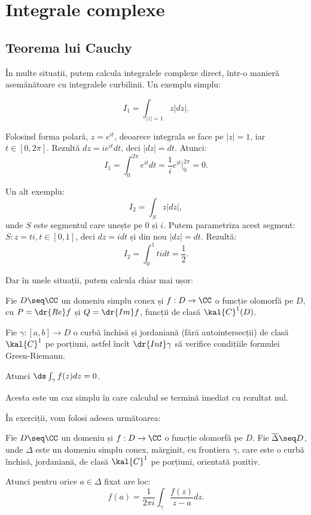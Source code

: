 
\chapter{Integrale complexe}

\section{Teorema lui Cauchy}
\indent\indent În multe situații, putem calcula integralele complexe direct,
într-o manieră asemănătoare cu integralele curbilinii. Un exemplu simplu:

\[
  I_1 = \int_{|z| = 1} z |dz|.
\]

Folosind forma polară, $ z = e^{it} $, deoarece integrala se face pe
$ |z| = 1 $, iar $ t \in [0, 2\pi] $. Rezultă $ dz = ie^{it} dt $,
deci $ |dz| = dt $. Atunci:
\[
  I_1 = \int_0^{2\pi} e^{it} dt = \dfrac{1}{i} e^{it} \Big|_0^{2\pi} = 0.
\]

Un alt exemplu:
\[
  I_2 = \int_S z |dz|,
\]
unde $ S $ este segmentul care unește pe $ 0 $ și $ i $. Putem parametriza
acest segment: $S : z = ti, t \in [0,1] $, deci $ dz = idt $ și din nou
$ |dz| = dt $. Rezultă:
\[
  I_2 = \int_0^1 tidt = \dfrac{1}{2}.
\]

Dar în unele situații, putem calcula chiar mai ușor:
\begin{theorem}[Cauchy]\label{thm:tcauchy} 
  Fie $ D \seq \CC $ un domeniu simplu conex și $ f : D \to \CC $ o funcție
  olomorfă pe $ D $, cu $ P = \dr{Re}f $ și $ Q = \dr{Im} f $, funcții de clasă
  $ \kal{C}^1(D) $.

  Fie $ \gamma : [a, b] \to D $ o curbă închisă și jordaniană (fără autointersecții)
  de clasă $ \kal{C}^1 $ pe porțiuni, astfel încît $ \dr{Int}\gamma $ să verifice
  condițiile formulei Green-Riemann.

  Atunci $ \ds\int_\gamma f(z) dz = 0 $.
\end{theorem}

Acesta este un caz simplu în care calculul se termină imediat cu rezultat nul.

În exerciții, vom folosi adesea următoarea:
\begin{theorem}\label{thm:fintcauchy}
  Fie $ D \seq \CC $ un domeniu și $ f : D \to \CC $ o funcție olomorfă pe $ D $.
  Fie $ \overline{\Delta} \seq D $, unde $ \Delta $ este un domeniu simplu conex,
  mărginit, cu frontiera $ \gamma $, care este o curbă închisă, jordaniană, de
  clasă $ \kal{C}^1 $ pe porțiuni, orientată pozitiv.

  Atunci pentru orice $ a \in \Delta $ fixat are loc:
  \[
    f(a) = \dfrac{1}{2 \pi i} \int_\gamma \dfrac{f(z)}{z - a} dz.
  \]
\end{theorem}

